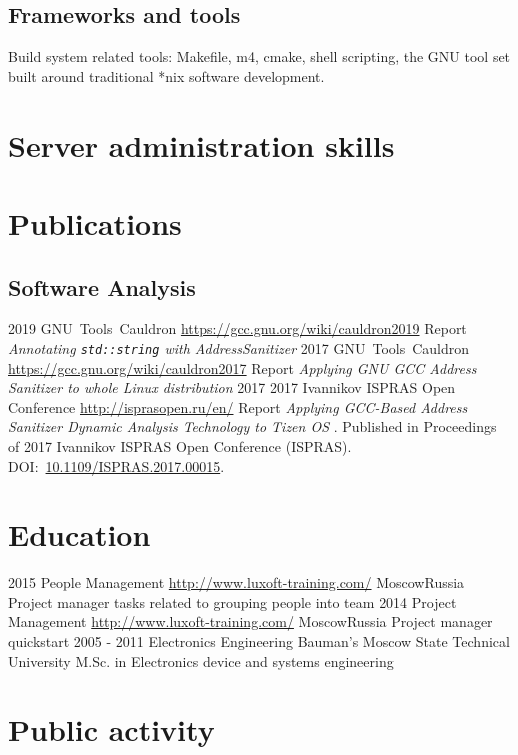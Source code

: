 \documentclass[11pt,a4paper]{moderncv}
\begin{document}
\subsection{Frameworks and tools}
 {Build system related tools: Makefile, m4, cmake, shell scripting, the GNU tool set built around
  traditional *nix software development.}





\section{Server administration skills}

\section{Publications}
\subsection{Software Analysis}
  \cventry
    {2019}
    {GNU~Tools~Cauldron}
    {\url{https://gcc.gnu.org/wiki/cauldron2019}}
    {}{}
    {Report \textit{Annotating \texttt{std::string} with AddressSanitizer}}
  \cventry
    {2017}
    {GNU~Tools~Cauldron}
    {\url{https://gcc.gnu.org/wiki/cauldron2017}}
    {}{}
    {Report \textit{Applying GNU GCC Address Sanitizer to whole Linux distribution}}
  \cventry
    {2017}
    {2017 Ivannikov ISPRAS Open Conference}
    {\url{http://isprasopen.ru/en/}}
    {}{}
    {Report \textit{Applying GCC-Based Address Sanitizer Dynamic Analysis
        Technology to Tizen OS }.\newline{}
      Published in Proceedings of 2017 Ivannikov ISPRAS Open Conference
      (ISPRAS).\newline{}
      DOI:~\href{https://doi.org/10.1109/ISPRAS.2017.00015}{10.1109/ISPRAS.2017.00015}.
    }
\section{Education}
  \cventry
    {2015}
    {People Management}
    {\url{http://www.luxoft-training.com/}}
    {Moscow}{Russia}
    {Project manager tasks related to grouping people into team}
  \cventry
    {2014}
    {Project Management}
    {\url{http://www.luxoft-training.com/}}
    {Moscow}{Russia}
    {Project manager quickstart}
  \cventry
    {2005 - 2011}
    {Electronics Engineering}
    {Bauman's Moscow State Technical University}
    {}{}
    {M.Sc. in Electronics device and systems engineering}
\section{Public activity}
\end{document}
